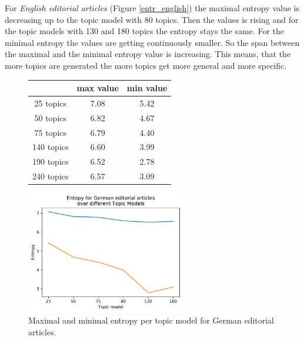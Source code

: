 For \textit{English editorial articles} (Figure \ref{entr_english}) the maximal entropy value is decreasing up to the topic model with 80 topics. Then the values is rising and for the topic models with 130 and 180 topics the entropy stays the same. For the minimal entropy the values are getting continuously smaller. So the span between the maximal and the minimal entropy value is increasing. This means, that the more topics are generated the more topics get more general and more specific. 
\begin{figure}[h]
	\begin{minipage}{0.5\textwidth}
		\centering
		\begin{tabular}[t]{c|cc}
			&max value & min value\\
			\hline
			25 topics&7.08&5.42\\
			50 topics&	6.82&4.67\\
			75 topics&	6.79&4.40\\
			140 topics&	6.60&3.99\\
			190 topics &6.52&2.78\\
			240 topics&	6.57&3.09\\
		\end{tabular}
	\end{minipage}%
	\begin{minipage}{0.5\textwidth}
		\centering
		\includegraphics[width=7cm]{gfx/Eval_IC/German_Editorial_Entropy.pdf}
	\end{minipage}
	\caption{Maximal and minimal entropy per topic model for German editorial articles.}
	\label{entr_german}
\end{figure}

